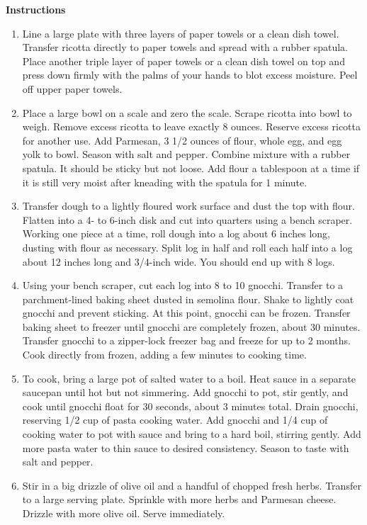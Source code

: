 \documentclass{article}
\numberwithin{figure}{section}
\numberwithin{equation}{section}
\begin{document}
{\bf Instructions}
\begin{enumerate}
\item 
Line a large plate with three layers of paper towels or a clean dish towel. Transfer ricotta directly to paper towels and spread with a rubber spatula. Place another triple layer of paper towels or a clean dish towel on top and press down firmly with the palms of your hands to blot excess moisture. Peel off upper paper towels.
\item Place a large bowl on a scale and zero the scale. Scrape ricotta into bowl to weigh. Remove excess ricotta to leave exactly 8 ounces. Reserve excess ricotta for another use. Add Parmesan, 3 1/2 ounces of flour, whole egg, and egg yolk to bowl. Season with salt and pepper. Combine mixture with a rubber spatula. It should be sticky but not loose. Add flour a tablespoon at a time if it is still very moist after kneading with the spatula for 1 minute.
\item Transfer dough to a lightly floured work surface and dust the top with flour. Flatten into a 4- to 6-inch disk and cut into quarters using a bench scraper. Working one piece at a time, roll dough into a log about 6 inches long, dusting with flour as necessary. Split log in half and roll each half into a log about 12 inches long and 3/4-inch wide. You should end up with 8 logs.
\item Using your bench scraper, cut each log into 8 to 10 gnocchi. Transfer to a parchment-lined baking sheet dusted in semolina flour. Shake to lightly coat gnocchi and prevent sticking. At this point, gnocchi can be frozen. Transfer baking sheet to freezer until gnocchi are completely frozen, about 30 minutes. Transfer gnocchi to a zipper-lock freezer bag and freeze for up to 2 months. Cook directly from frozen, adding a few minutes to cooking time.
\item To cook, bring a large pot of salted water to a boil. Heat sauce in a separate saucepan until hot but not simmering. Add gnocchi to pot, stir gently, and cook until gnocchi float for 30 seconds, about 3 minutes total. Drain gnocchi, reserving 1/2 cup of pasta cooking water. Add gnocchi and 1/4 cup of cooking water to pot with sauce and bring to a hard boil, stirring gently. Add more pasta water to thin sauce to desired consistency. Season to taste with salt and pepper.
\item Stir in a big drizzle of olive oil and a handful of chopped fresh herbs. Transfer to a large serving plate. Sprinkle with more herbs and Parmesan cheese. Drizzle with more olive oil. Serve immediately.
\end{enumerate}
\end{document}
